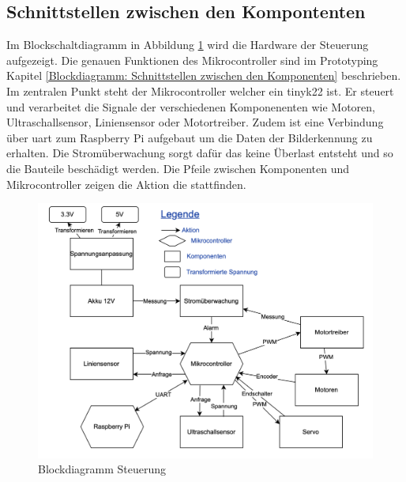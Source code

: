 \newpage

\subsection{Schnittstellen zwischen den Kompontenten}

Im Blockschaltdiagramm in Abbildung \ref{Blockdiagramm Steuerung} wird die Hardware der Steuerung aufgezeigt. Die genauen Funktionen des Mikrocontroller sind im Prototyping Kapitel \ref{Blockdiagramm: Schnittstellen zwischen den Komponenten} beschrieben. Im zentralen Punkt steht der Mikrocontroller welcher ein \acrshort{tinyk22} ist. Er steuert und verarbeitet die Signale der verschiedenen Komponenenten wie Motoren, Ultraschallsensor, Liniensensor oder Motortreiber. Zudem ist eine Verbindung über \acrfull{uart} zum Raspberry Pi aufgebaut um die Daten der Bilderkennung zu erhalten. Die Stromüberwachung sorgt dafür das keine Überlast entsteht und so die Bauteile beschädigt werden. Die Pfeile zwischen Komponenten und Mikrocontroller zeigen die Aktion die stattfinden. 




\begin{figure}[H]
    \centering
    \includegraphics[width=1\linewidth]{img/Blockdiagramm-ET-drawio.drawio-2.png}
    \caption{Blockdiagramm Steuerung}
    \label{Blockdiagramm Steuerung}
\end{figure}


